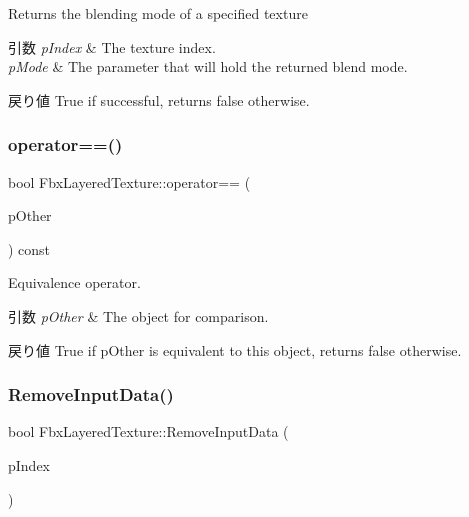 Returns the blending mode of a specified texture 
\begin{DoxyParams}{引数}
{\em p\+Index} & The texture index. \\
\hline
{\em p\+Mode} & The parameter that will hold the returned blend mode. \\
\hline
\end{DoxyParams}
\begin{DoxyReturn}{戻り値}
{\ttfamily True} if successful, returns {\ttfamily false} otherwise. 
\end{DoxyReturn}
\mbox{\label{class_fbx_layered_texture_a8a01816e03ca531e7bdd8c65804febf7}} 
\subsubsection{\texorpdfstring{operator==()}{operator==()}}
{\footnotesize\ttfamily bool Fbx\+Layered\+Texture\+::operator== (\begin{DoxyParamCaption}\item[{const \hyperlink{class_fbx_layered_texture}{Fbx\+Layered\+Texture} \&}]{p\+Other }\end{DoxyParamCaption}) const}

Equivalence operator. 
\begin{DoxyParams}{引数}
{\em p\+Other} & The object for comparison. \\
\hline
\end{DoxyParams}
\begin{DoxyReturn}{戻り値}
{\ttfamily True} if p\+Other is equivalent to this object, returns {\ttfamily false} otherwise. 
\end{DoxyReturn}
\mbox{\label{class_fbx_layered_texture_a6d1190feade206649f73444c5b114bd1}} 
\subsubsection{\texorpdfstring{Remove\+Input\+Data()}{RemoveInputData()}}
{\footnotesize\ttfamily bool Fbx\+Layered\+Texture\+::\+Remove\+Input\+Data (\begin{DoxyParamCaption}\item[{int}]{p\+Index }\end{DoxyParamCaption})\hspace{0.3cm}{\ttfamily [protected]}}

